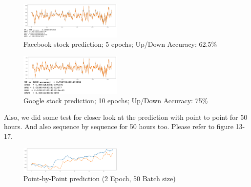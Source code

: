 \usepackage{fancyhdr}\documentclass[conference]{IEEEtran}
\begin{document}
\begin{figure}[htpb]
\begin{center}
\includegraphics[width=0.45\textwidth]{LSTM_source/LSTM_10_Facebook.png}
\vspace{-0.2cm}
\caption{Facebook stock prediction; 5 epochs; Up/Down Accuracy: 62.5\%}
\label{fig_bar}
\end{center}
\vspace{-0.4cm}
\end{figure}

\begin{figure}[htpb]
\begin{center}
\includegraphics[width=0.45\textwidth]{LSTM_source/LSTM_10_Google.png}
\vspace{-0.2cm}
\caption{Google stock prediction; 10 epochs; Up/Down Accuracy: 75\%}
\label{fig_bar}
\end{center}
\vspace{-0.4cm}
\end{figure}
 
Also, we did some test for closer look at the prediction with point to point for 50 hours. And also sequence by sequence for 50 hours too. Please refer to figure 13-17.


\begin{figure}[htpb]
\begin{center}
\includegraphics[width=0.45\textwidth]{LSTM_source/PP_2_50.PNG}
\vspace{-0.2cm}
\caption{Point-by-Point prediction (2 Epoch, 50 Batch size)}
\label{fig_predict}
\end{center}
\vspace{-0.6cm}
\end{figure}
\end{document}
